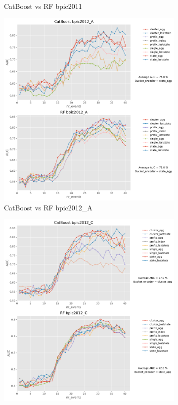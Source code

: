 \documentclass[twoside,11pt]{Latex/Classes/PhDthesisPSnPDF}
\begin{document}
\begin{figure}[t!]
\begin{subfigure}{0.48\textwidth}
		\caption{CatBoost vs RF bpic2011} \label{fig:b11rf}
	\end{subfigure}
	
	\medskip
	\begin{subfigure}{0.48\textwidth}
		\includegraphics[width=\linewidth]{images/catboost/graphsrf/bpic2012_A_CatBoost_rf.pdf}
		\caption{CatBoost vs RF bpic2012\_A} \label{fig:b12acr}
	\end{subfigure}\hspace*{\fill}
	\begin{subfigure}{0.48\textwidth}
		\includegraphics[width=\linewidth]{images/catboost/graphsrf/bpic2012_C_CatBoost_rf.pdf}

\end{subfigure}
\end{figure}
\end{document}
